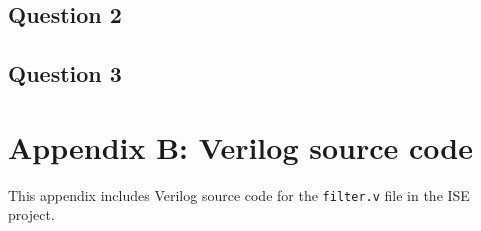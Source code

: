 \subsection{Question 2}
\subsection{Question 3}
\section{Appendix B: Verilog source code}
This appendix includes Verilog source code for the \texttt{filter.v} file in the ISE project.

\begin{verbatim}
\end{verbatim}
